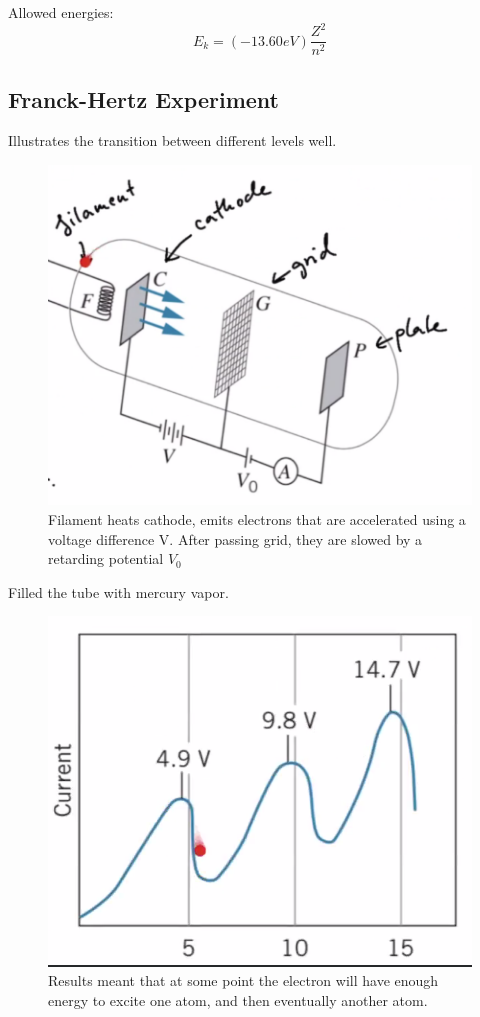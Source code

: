 \documentclass[class=article,crop=false]{standalone}
\begin{document}
Allowed energies:
\[E_k = (-13.60 eV) \frac{Z^2}{n^2} \]

\subsection{Franck-Hertz Experiment}
Illustrates the transition between different levels well. 

\begin{figure}[h]
	\centering
	\includegraphics[width=.7\linewidth]{./Images/franck-hertz.png}
	\caption{Filament heats cathode, emits electrons that are accelerated using a voltage difference V. After passing grid, they are slowed by a retarding potential $V_0$}
\end{figure}

Filled the tube with mercury vapor.

\begin{figure}[h!]
	\centering
	\includegraphics[width=.7\linewidth]{./Images/franck-hertz-results.png}
	\caption{Results meant that at some point the electron will have enough energy to excite one atom, and then eventually another atom.}
\end{figure}
\end{document}
